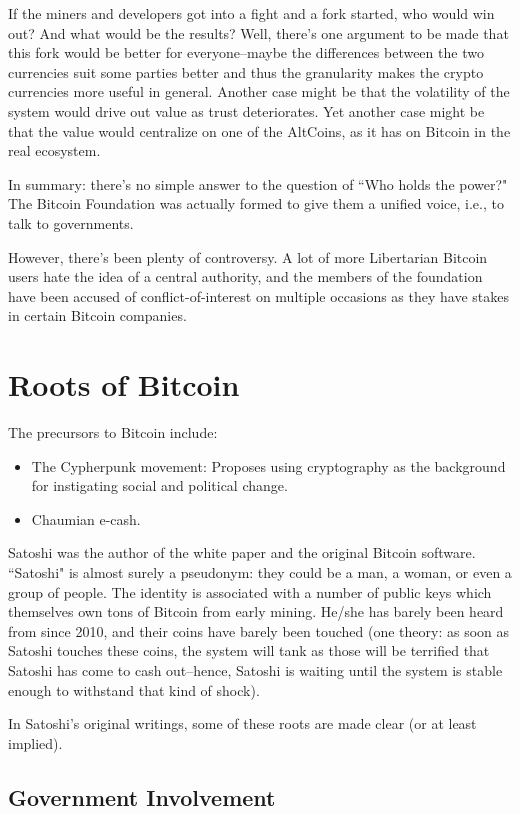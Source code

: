 \documentclass[12pt]{article}
\begin{document}
If the miners and developers got into a fight and a fork started, who would win out? And what would be the results? Well, there's one argument to be made that this fork would be better for everyone--maybe the differences between the two currencies suit some parties better and thus the granularity makes the crypto currencies more useful in general. Another case might be that the volatility of the system would drive out value as trust deteriorates. Yet another case might be that the value would centralize on one of the AltCoins, as it has on Bitcoin in the real ecosystem.

In summary: there's no simple answer to the question of ``Who holds the power?" The Bitcoin Foundation was actually formed to give them a unified voice, i.e., to talk to governments.

However, there's been plenty of controversy. A lot of more Libertarian Bitcoin users hate the idea of a central authority, and the members of the foundation have been accused of conflict-of-interest on multiple occasions as they have stakes in certain Bitcoin companies.

\section*{Roots of Bitcoin}

The precursors to Bitcoin include:
\begin{itemize}
\item The Cypherpunk movement: Proposes using cryptography as the background for instigating social and political change.
\item Chaumian e-cash.
\end{itemize}

Satoshi was the author of the white paper and the original Bitcoin software. ``Satoshi" is almost surely a pseudonym: they could be a man, a woman, or even a group of people. The identity is associated with a number of public keys which themselves own tons of Bitcoin from early mining. He/she has barely been heard from since 2010, and their coins have barely been touched (one theory: as soon as Satoshi touches these coins, the system will tank as those will be terrified that Satoshi has come to cash out--hence, Satoshi is waiting until the system is stable enough to withstand that kind of shock).

In Satoshi's original writings, some of these roots are made clear (or at least implied).

\subsection*{Government Involvement}
\end{document}
